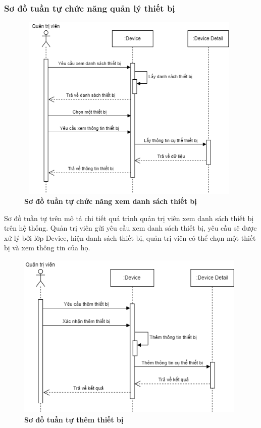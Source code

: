 \subsubsection{Sơ đồ tuần tự chức năng quản lý thiết bị}
\begin{figure}[H]
  \centering
  \includegraphics[width=11cm,height=9cm]{Images/sequence/sequence_manage_device.png}
  \caption[Sơ đồ tuần tự chức năng xem danh sách thiết bị]{\bfseries \fontsize{12pt}{0pt}
  \selectfont Sơ đồ tuần tự chức năng xem danh sách thiết bị}
  \label{sequence_manage_device} %
\end{figure}
Sơ đồ tuần tự trên mô tả chi tiết quá trình quản trị viên xem danh sách thiết bị trên hệ thống. Quản trị viên gửi yêu cầu xem danh sách thiết bị, 
yêu cầu sẽ được xử lý bởi lớp Device, hiện danh sách thiết bị, quản trị viên có thể chọn một thiết bị và xem thông tin của họ. 
\begin{figure}[H]
  \centering
  \includegraphics[width=11cm,height=8cm]{Images/sequence/sequence_manage_add_device.png}
  \caption[Sơ đồ tuần tự thêm thiết bị]{\bfseries \fontsize{12pt}{0pt}
  \selectfont Sơ đồ tuần tự thêm thiết bị}
  \label{sequence_manage_add_device} %
\end{figure}
